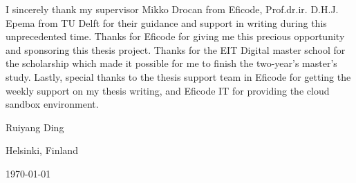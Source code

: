 I sincerely thank my supervisor Mikko Drocan from Eficode, Prof.dr.ir. D.H.J. Epema from TU Delft for their guidance and support in writing during this unprecedented time. Thanks for Eficode for giving me this precious opportunity and sponsoring this thesis project. Thanks for the EIT Digital master school for the scholarship which made it possible for me to finish the two-year's master's study. Lastly, special thanks to the thesis support team in Eficode for getting the weekly support on my thesis writing, and Eficode IT for providing the cloud sandbox environment.
\vspace{1\baselineskip}


\noindent
Ruiyang Ding

\vspace{1\baselineskip}

\noindent
Helsinki, Finland

\noindent
\today
